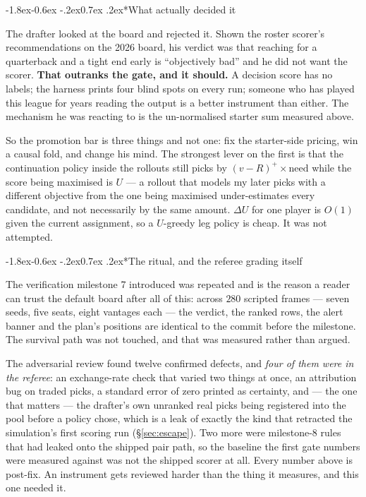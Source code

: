 \documentclass[10pt,a4paper]{article}
\makeatletter
\theoremstyle{plain}
\theoremstyle{definition}
\theoremstyle{remark}
\renewcommand\subsubsection{\@startsection{subsubsection}{3}{\z@}%
  {-1.8ex\@plus -0.6ex \@minus -.2ex}{0.7ex \@plus .2ex}{\normalfont\normalsize\bfseries}}
\makeatother
\begin{document}
\subsubsection*{What actually decided it}

The drafter looked at the board and rejected it. Shown the roster scorer's recommendations
on the 2026 board, his verdict was that reaching for a quarterback and a tight end early is
``objectively bad'' and he did not want the scorer. \textbf{That outranks the gate, and it
should.} A decision score has no labels; the harness prints four blind spots on every run;
someone who has played this league for years reading the output is a better instrument than
either. The mechanism he was reacting to is the un-normalised starter sum measured above.

So the promotion bar is three things and not one: fix the starter-side pricing, win a
causal fold, and change his mind. The strongest lever on the first is that the continuation
policy inside the rollouts still picks by $(v - R)^+ \times \mathrm{need}$ while the score
being maximised is $U$ --- a rollout that models my later picks with a different objective
from the one being maximised under-estimates every candidate, and not necessarily by the
same amount. $\Delta U$ for one player is $O(1)$ given the current assignment, so a
$U$-greedy leg policy is cheap. It was not attempted.

\subsubsection*{The ritual, and the referee grading itself}

The verification milestone 7 introduced was repeated and is the reason a reader can trust
the default board after all of this: across $280$ scripted frames --- seven seeds, five
seats, eight vantages each --- the verdict, the ranked rows, the alert banner and the
plan's positions are identical to the commit before the milestone. The survival path was
not touched, and that was measured rather than argued.

The adversarial review found twelve confirmed defects, and \emph{four of them were in the
referee}: an exchange-rate check that varied two things at once, an attribution bug on
traded picks, a standard error of zero printed as certainty, and --- the one that matters
--- the drafter's own unranked real picks being registered into the pool before a policy
chose, which is a leak of exactly the kind that retracted the simulation's first scoring
run (\S\ref{sec:escape}). Two more were milestone-8 rules that had leaked onto the shipped
pair path, so the baseline the first gate numbers were measured against was not the shipped
scorer at all. Every number above is post-fix. An instrument gets reviewed harder than the
thing it measures, and this one needed it.
\end{document}
